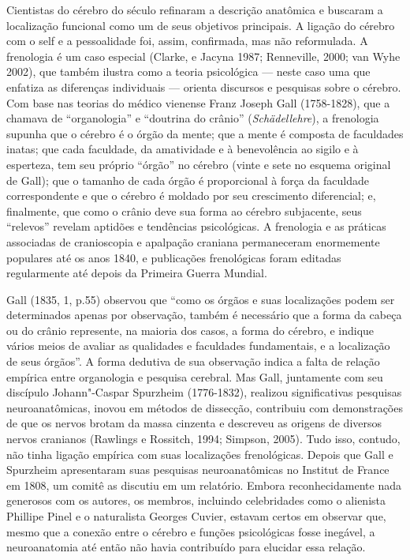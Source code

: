 Cientistas do cérebro do século  refinaram a descrição anatômica e
buscaram a localização funcional como um de seus objetivos principais. A
ligação do cérebro com o self e a pessoalidade foi, assim, confirmada,
mas não reformulada. A frenologia é um caso especial (Clarke, e Jacyna
1987; Renneville, 2000; van Wyhe 2002), que também ilustra como a teoria
psicológica --- neste caso uma que enfatiza as diferenças individuais
--- orienta discursos e pesquisas sobre o cérebro. Com base nas teorias
do médico vienense Franz Joseph Gall (1758-1828), que a chamava de
``organologia'' e ``doutrina do crânio'' (\emph{Schädellehre}), a
frenologia supunha que o cérebro é o órgão da mente; que a mente é
composta de faculdades inatas; que cada faculdade, da amatividade e à
benevolência ao sigilo e à esperteza, tem seu próprio ``órgão'' no
cérebro (vinte e sete no esquema original de Gall); que o tamanho de
cada órgão é proporcional à força da faculdade correspondente e que o
cérebro é moldado por seu crescimento diferencial; e, finalmente, que
como o crânio deve sua forma ao cérebro subjacente, seus ``relevos''
revelam aptidões e tendências psicológicas. A frenologia e as práticas
associadas de cranioscopia e apalpação craniana permaneceram enormemente
populares até os anos 1840, e publicações frenológicas foram editadas
regularmente até depois da Primeira Guerra Mundial.

Gall (1835, 1, p.55) observou que ``como os órgãos e suas localizações
podem ser determinados apenas por observação, também é necessário que a
forma da cabeça ou do crânio represente, na maioria dos casos, a forma
do cérebro, e indique vários meios de avaliar as qualidades e faculdades
fundamentais, e a localização de seus órgãos''. A forma dedutiva de sua
observação indica a falta de relação empírica entre organologia e
pesquisa cerebral. Mas Gall, juntamente com seu discípulo Johann"-Caspar
Spurzheim (1776-1832), realizou significativas pesquisas
neuroanatômicas, inovou em métodos de dissecção, contribuiu com
demonstrações de que os nervos brotam da massa cinzenta e descreveu as
origens de diversos nervos cranianos (Rawlings e Rossitch, 1994;
Simpson, 2005). Tudo isso, contudo, não tinha ligação empírica com suas
localizações frenológicas. Depois que Gall e Spurzheim apresentaram suas
pesquisas neuroanatômicas no Institut de France em 1808, um comitê as
discutiu em um relatório. Embora reconhecidamente nada generosos com os
autores, os membros, incluindo celebridades como o alienista Phillipe
Pinel e o naturalista Georges Cuvier, estavam certos em observar que,
mesmo que a conexão entre o cérebro e funções psicológicas fosse
inegável, a neuroanatomia até então não havia contribuído para elucidar
essa relação.

